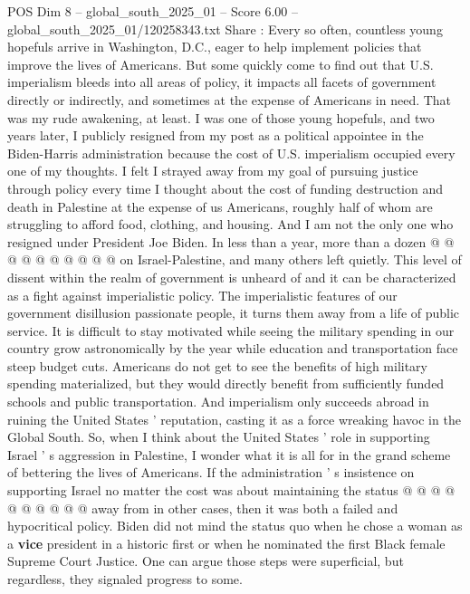 \begin{textsample}{POS Dim 8 – global\_south\_2025\_01 – Score 6.00 – global\_south\_2025\_01/120258343.txt}  \label{ex:f8_pos_322}
Share : Every so often, countless young hopefuls arrive in Washington, D.C., eager to help implement policies that improve the lives of Americans.
But some quickly come to find out that U.S. imperialism bleeds into all areas of policy, it impacts all facets of government directly or indirectly, and sometimes at the expense of Americans in need.
That was my rude awakening, at least.
I was one of those young hopefuls, and two years later, I publicly resigned from my post as a political appointee in the Biden-Harris administration because the cost of U.S. imperialism occupied every one of my thoughts.
I felt I strayed away from my goal of pursuing justice through policy every time I thought about the cost of funding destruction and death in Palestine at the expense of us Americans, roughly half of whom are struggling to afford food, clothing, and housing.
And I am not the only one who resigned under President Joe Biden.
In less than a year, more than a dozen @ @ @ @ @ @ @ @ @ @ on Israel-Palestine, and many others left quietly.
This level of dissent within the realm of government is unheard of and it can be characterized as a fight against imperialistic policy.
The imperialistic features of our government disillusion passionate people, it turns them away from a life of public service.
It is difficult to stay motivated while seeing the military spending in our country grow astronomically by the year while education and transportation face steep budget cuts.
Americans do not get to see the benefits of high military spending materialized, but they would directly benefit from sufficiently funded schools and public transportation.
And imperialism only succeeds abroad in ruining the United States ' reputation, casting it as a force wreaking havoc in the Global South.
So, when I think about the United States ' role in supporting Israel ' s aggression in Palestine, I wonder what it is all for in the grand scheme of bettering the lives of Americans.
If the administration ' s insistence on supporting Israel no matter the cost was about maintaining the status @ @ @ @ @ @ @ @ @ @ away from in other cases, then it was both a failed and hypocritical policy.
Biden did not mind the status quo when he chose a woman as a \textbf{vice} president in a historic first or when he nominated the first Black female Supreme Court Justice.
One can argue those steps were superficial, but regardless, they signaled progress to some.

\end{textsample}
